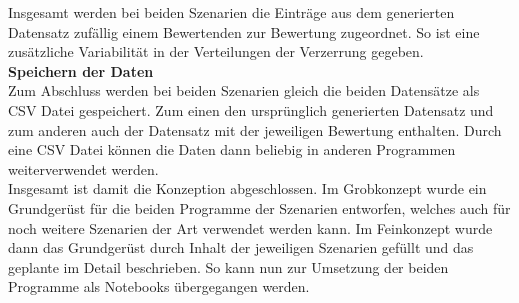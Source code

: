 \begin{onehalfspace}
Insgesamt werden bei beiden Szenarien die Einträge aus dem generierten Datensatz zufällig einem Bewertenden zur Bewertung zugeordnet. So ist eine zusätzliche Variabilität in der Verteilungen der Verzerrung gegeben.\\
\textbf{Speichern der Daten}\\
Zum Abschluss werden bei beiden Szenarien gleich die beiden Datensätze als CSV Datei gespeichert. Zum einen den ursprünglich generierten Datensatz und zum anderen auch der Datensatz mit der jeweiligen Bewertung enthalten. Durch eine CSV Datei können die Daten dann beliebig in anderen Programmen weiterverwendet werden.\\
Insgesamt ist damit die Konzeption abgeschlossen. Im Grobkonzept wurde ein Grundgerüst für die beiden Programme der Szenarien entworfen, welches auch für noch weitere Szenarien der Art verwendet werden kann. Im Feinkonzept wurde dann das Grundgerüst durch Inhalt der jeweiligen Szenarien gefüllt und das geplante im Detail beschrieben. So kann nun zur Umsetzung der beiden Programme als Notebooks übergegangen werden.

\end{onehalfspace}

